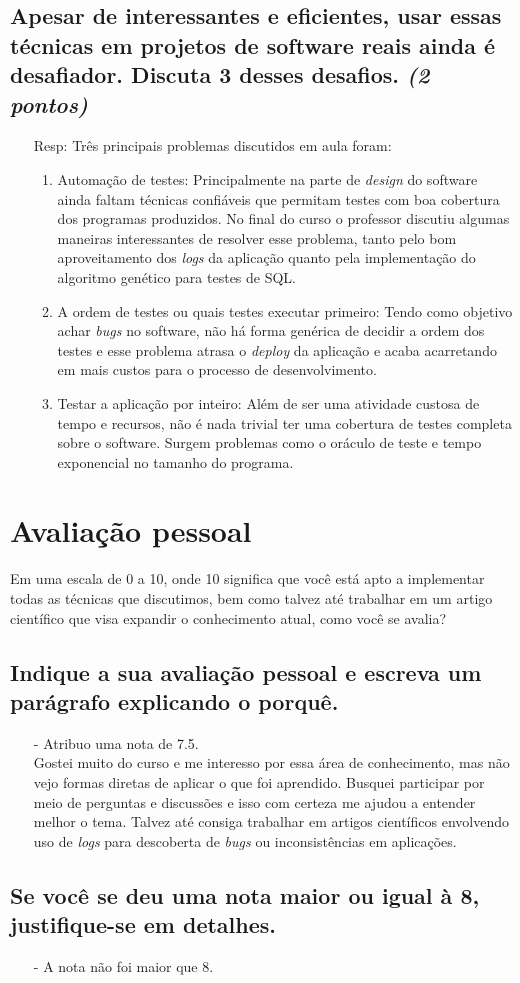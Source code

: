 \documentclass[paper=a4, fontsize=11pt]{scrartcl} %
\numberwithin{equation}{section} %
\numberwithin{figure}{section} %
\numberwithin{table}{section} %
\begin{document}
\subsection{Apesar de interessantes e eficientes, usar essas técnicas em projetos de software reais ainda é desafiador. Discuta 3 desses desafios. \textit{(2 pontos)}}
	\begin{itemize}
		\item[Resp:] Três principais problemas discutidos em aula foram:
		\begin{enumerate}
			\item Automação de testes: Principalmente na parte de \textit{design} do software ainda faltam técnicas confiáveis que permitam testes com boa cobertura dos programas produzidos. No final do curso o professor discutiu algumas maneiras interessantes de resolver esse problema, tanto pelo bom aproveitamento dos \textit{logs} da aplicação quanto pela implementação do algoritmo genético para testes de SQL.
			\item A ordem de testes ou quais testes executar primeiro: Tendo como objetivo achar \textit{bugs} no software, não há forma genérica de decidir a ordem dos testes e esse problema atrasa o \textit{deploy} da aplicação e acaba acarretando em mais custos para o processo de desenvolvimento.
			\item Testar a aplicação por inteiro: Além de ser uma atividade custosa de tempo e recursos, não é nada trivial ter uma cobertura de testes completa sobre o software. Surgem problemas como o oráculo de teste e tempo exponencial no tamanho do programa.
		\end{enumerate}
	\end{itemize}

\section{Avaliação pessoal}

Em uma escala de 0 a 10, onde 10 significa que você está apto a implementar todas as técnicas que discutimos, bem como talvez até trabalhar em um artigo científico que visa expandir o conhecimento atual, como você se avalia?


\subsection{Indique a sua avaliação pessoal e escreva um parágrafo explicando o porquê.}
\begin{itemize}
    \item[-] Atribuo uma nota de 7.5.\\
    Gostei muito do curso e me interesso por essa área de conhecimento, mas não vejo formas diretas de aplicar o que foi aprendido. Busquei participar por meio de perguntas e discussões e isso com certeza me ajudou a entender melhor o tema. Talvez até consiga trabalhar em artigos científicos envolvendo uso de \textit{logs} para descoberta de \textit{bugs} ou inconsistências em aplicações.
\end{itemize}

\subsection{Se você se deu uma nota maior ou igual à 8, justifique-se em detalhes.}

\begin{itemize}
    \item[-] A nota não foi maior que 8.
\end{itemize}
\end{document}
